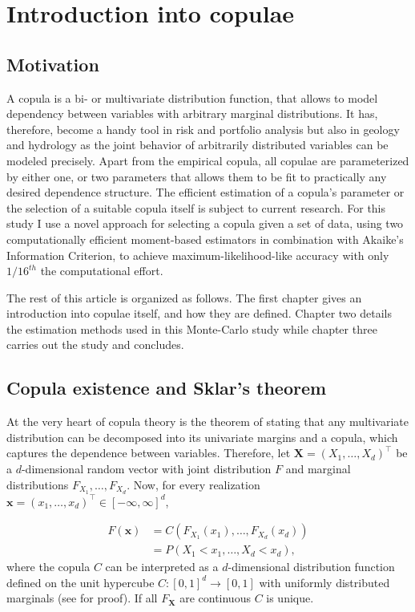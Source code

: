 
\chapter{Introduction into copulae}

\label{Chapter1}

\section{Motivation}

A copula is a bi- or multivariate distribution function, that allows to model dependency between variables with arbitrary marginal distributions. It has, therefore, become a handy tool in risk and portfolio analysis but also in geology and hydrology as the joint behavior of arbitrarily distributed variables can be modeled precisely. Apart from the empirical copula, all copulae are parameterized by either one, or two parameters that allows them to be fit to practically any desired dependence structure. The efficient estimation of a copula's parameter or the selection of a suitable copula itself is subject to current research. For this study I use a novel approach for selecting a copula given a set of data, using two computationally efficient moment-based estimators in combination with Akaike's Information Criterion, to achieve maximum-likelihood-like accuracy with only $1/16^{th}$ the computational effort.

The rest of this article is organized as follows. The first chapter gives an introduction into copulae itself, and how they are defined. Chapter two details the estimation methods used in this Monte-Carlo study while chapter three carries out the study and concludes.

\section{Copula existence and Sklar's theorem}

At the very heart of copula theory is the theorem of \citet{sklar1959} stating that any multivariate distribution can be decomposed into its univariate margins and a copula, which captures the dependence between variables. Therefore, let $\mathbf{X}=\left(X_1,\dots,X_d\right)^{\top}$ be a $d$-dimensional random vector with joint distribution $F$ and marginal distributions $F_{X_1},\dots, F_{X_d}$. Now, for every realization $\mathbf{x}=\left(x_1,\dots,x_d\right)^{\top} \in \left[-\infty,\infty\right]^{d}$,

\begin{equation}
	\label{sklar}
	\begin{split}
		F(\mathbf{x})&=C\left(F_{X_1}(x_1),\dots, F_{X_d}(x_d)\right)\\
		&= P(X_1 < x_1, \dots, X_d < x_d),
	\end{split}
\end{equation}
%
where the copula $C$ can be interpreted as a $d$-dimensional distribution function defined on the unit hypercube $C:[0,1]^{d} \rightarrow [0,1]$ with uniformly distributed marginals (see \citet{angus1994probability} for proof). If all $F_{\mathbf{X}}$ are continuous $C$ is unique.

